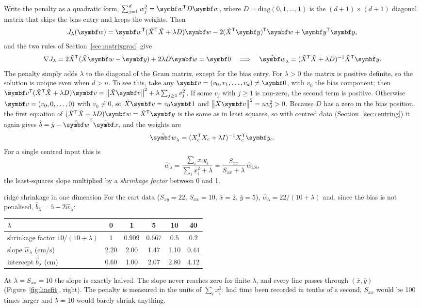 \documentclass[11pt]{article}
\newcommand{\Xt}{\tilde X}
\newcommand{\w}{\vect{w}}
\newcommand{\y}{\vect{y}}
\newcommand{\Ic}{D}
\begin{document}
Write the penalty as a quadratic form, $\sum_{j=1}^d w_j^2 = \w\T\Ic\w$, where $\Ic = \mathrm{diag}(0, 1, \dots, 1)$ is
the $(d+1)\times(d+1)$ diagonal matrix that skips the bias entry and keeps the weights. Then
\[
  J_\lambda(\w) = \w\T(\Xt\T\Xt + \lambda\Ic)\w - 2(\Xt\T\y)\T\w + \y\T\y ,
\]
and the two rules of Section~\ref{sec:matrixgrad} give
\[
  \nabla J_\lambda = 2\Xt\T(\Xt\w - \y) + 2\lambda\Ic\w = \vect{0}
  \quad\Longrightarrow\quad
  \hat{\w}_\lambda = (\Xt\T\Xt + \lambda \Ic)^{-1}\Xt\T\y .
\]
The penalty simply adds $\lambda$ to the diagonal of the Gram matrix, except for the bias entry. For $\lambda > 0$ the
matrix is positive definite, so the solution is unique even when $d > n$. To see this, take any
$\vect{v} = (v_0, v_1, \dots, v_d) \neq \vect{0}$, with $v_0$ the bias component; then
$\vect{v}\T(\Xt\T\Xt + \lambda\Ic)\vect{v} = \norm{\Xt\vect{v}}^2 + \lambda\sum_{j \ge 1} v_j^2$. If some $v_j$ with
$j \ge 1$ is non-zero, the second term is positive. Otherwise $\vect{v} = (v_0, 0, \dots, 0)$ with $v_0 \neq 0$, so
$\Xt\vect{v} = v_0\vect{1}$ and $\norm{\Xt\vect{v}}^2 = n v_0^2 > 0$. Because $\Ic$ has a zero in the bias position,
the first equation of $(\Xt\T\Xt + \lambda\Ic)\w = \Xt\T\y$ is the same as in least squares, so with centred data
(Section~\ref{sec:centring}) it again gives $\hat b = \bar y - \hat{\w}\T\bar{\x}$, and the weights are
\begin{equation}\label{eq:ridgec}
  \hat{\w}_\lambda = (X_c\T X_c + \lambda I)^{-1} X_c\T\y_c .
\end{equation}
For a single centred input this is
\[
  \hat w_\lambda = \frac{\sum_i x_i y_i}{\sum_i x_i^2 + \lambda} = \frac{S_{xx}}{S_{xx} + \lambda}\,\hat w_{\mathrm{LS}} ,
\]
the least-squares slope multiplied by a \emph{shrinkage factor} between 0 and 1.

\begin{worked}{ridge shrinkage in one dimension}
For the cart data ($S_{xy} = 22$, $S_{xx} = 10$, $\bar x = 2$, $\bar y = 5$), $\hat w_\lambda = 22/(10 + \lambda)$ and,
since the bias is not penalised, $\hat b_\lambda = 5 - 2\hat w_\lambda$:
\begin{center}\small
\begin{tabular}{lccccc}
\toprule
$\lambda$ & 0 & 1 & 5 & 10 & 40 \\
\midrule
shrinkage factor $10/(10 + \lambda)$ & 1 & 0.909 & 0.667 & 0.5 & 0.2 \\
slope $\hat w_\lambda$ (cm/s) & 2.20 & 2.00 & 1.47 & 1.10 & 0.44 \\
intercept $\hat b_\lambda$ (cm) & 0.60 & 1.00 & 2.07 & 2.80 & 4.12 \\
\bottomrule
\end{tabular}
\end{center}
At $\lambda = S_{xx} = 10$ the slope is exactly halved. The slope never reaches zero for finite $\lambda$, and every
line passes through $(\bar x, \bar y)$ (Figure~\ref{fig:linefit}, right). The penalty is measured in the units of
$\sum_i x_i^2$: had time been recorded in tenths of a second, $S_{xx}$ would be 100 times larger and $\lambda = 10$ would
barely shrink anything.
\end{worked}
\end{document}
